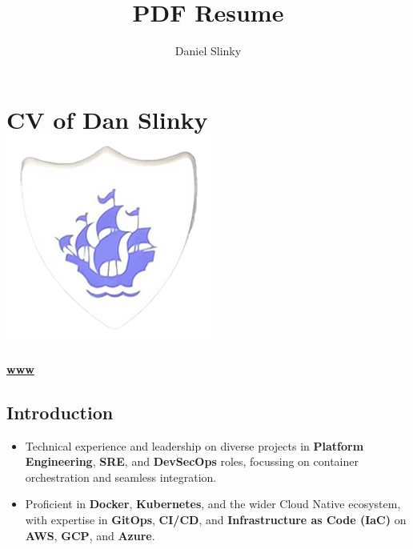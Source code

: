 \documentclass[
]{article}
\author{}
\date{}
\title{PDF Resume}
\author{Daniel Slinky}
\date{}
\providecommand{\tightlist}{%
  \setlength{\itemsep}{0pt}\setlength{\parskip}{0pt}}
\begin{document}

\hypertarget{simple-markdown-cv-of-dan-slinky}{%
\section[\faMarkdown CV of Dan Slinky ]{\texorpdfstring{\faMarkdown CV
of Dan Slinky
\protect\includegraphics{../../favicon.png}}{ CV of Dan Slinky }}\label{simple-markdown-cv-of-dan-slinky}}

\href{https://rtfm.danslinky.co.uk/resumes}{\textbf{www}}
\href{https://linkedin.com/in/danslinky}{\faLinkedin}
\href{https://github.com/danslinky}{\faGithub}
\href{mailto:sysadmin@danslinky.co.uk}{\faEnvelope}

\hypertarget{fontawesome-solid-terminal-introduction}{%
\subsection{\texorpdfstring{\faTerminal
Introduction}{ Introduction}}\label{fontawesome-solid-terminal-introduction}}

\begin{itemize}
\tightlist
\item
  Technical experience and leadership on diverse projects in
  \textbf{Platform Engineering}, \textbf{SRE}, and \textbf{DevSecOps}
  roles, focussing on container orchestration and seamless integration.
\item
  Proficient in \faDocker \textbf{Docker}, \faDharmachakra
  \textbf{Kubernetes}, and the wider Cloud Native ecosystem, with
  expertise in \textbf{GitOps}, \textbf{CI/CD}, and
  \textbf{Infrastructure as Code (IaC)} on \textbf{AWS}, \textbf{GCP},
  and \textbf{Azure}.
\end{itemize}
\end{document}
